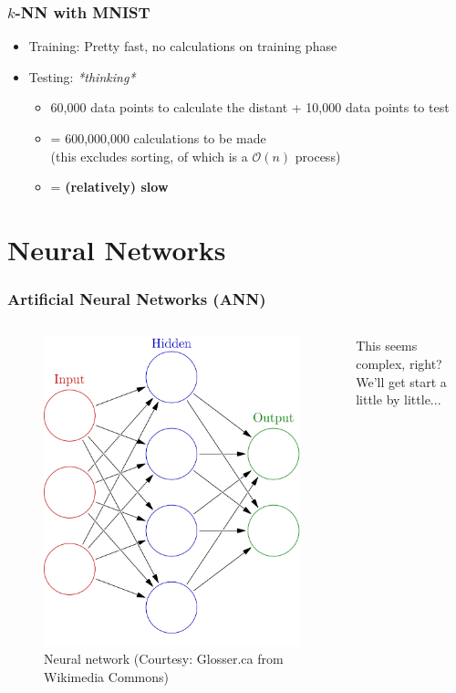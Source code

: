 \documentclass[aspectratio=169]{beamer}
\begin{document}
\begin{frame}
	\frametitle{$k$-NN with MNIST}
	\begin{itemize}
		\item Training: Pretty fast, no calculations on training phase
		\item Testing: \textit{*thinking*}
		      \begin{itemize}
			      \item 60,000 data points to calculate the distant + 10,000 data points to test
			      \item = 600,000,000 calculations to be made\\
			            (this excludes sorting, of which is a $\mathcal{O}(n)$ process)
			      \item = \textbf{(relatively) slow}
		      \end{itemize}
	\end{itemize}
\end{frame}

\section{Neural Networks}

\begin{frame}
	\frametitle{Artificial Neural Networks (ANN)}
	\begin{columns}
		\begin{figure}
			\includegraphics[width=0.7\linewidth,height=0.7\textheight,keepaspectratio]{imgs/ann.png}
			\caption{Neural network (Courtesy: Glosser.ca from Wikimedia Commons)}
		\end{figure}
		This seems complex, right? We'll get start a little by little...
	\end{columns}
\end{frame}
\end{document}

